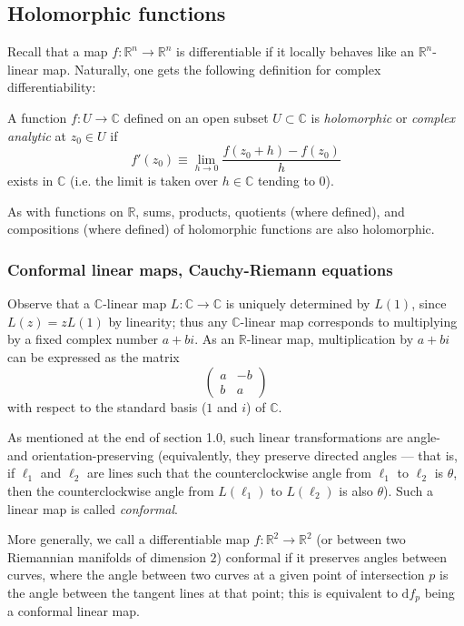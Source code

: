 \documentclass[10pt]{article}
\providecommand{\dd}{\mathrm d}
\providecommand{\CC}{\mathbb C}
\providecommand{\RR}{\mathbb R}
\providecommand{\vocab}[1]{{{\sffamily\textit{#1}}}}
\begin{document}
\subsection{Holomorphic functions}

Recall that a map $f\colon\RR^n\to\RR^n$ is differentiable
if it locally behaves like an $\RR^n$-linear map.
Naturally, one gets the following definition for complex differentiability:
\begin{definition}[Holomorphic]
    \label{def:holomorphic}
    A function $f\colon U\to\CC$ defined on an open subset $U\subset\CC$
    is \vocab{holomorphic} or \vocab{complex analytic} at $z_0\in U$ if
    \begin{equation*}
	f'(z_0)\equiv\lim_{h\to 0}\frac{f(z_0+h) - f(z_0)}h
    \end{equation*}
    exists in $\CC$ (i.e. the limit is taken over $h\in\CC$ tending to $0$).
\end{definition}

As with functions on $\RR$, sums, products, quotients (where defined),
and compositions (where defined) of holomorphic functions
are also holomorphic.

\subsubsection{Conformal linear maps, Cauchy-Riemann equations}
Observe that a $\CC$-linear map $L\colon\CC\to\CC$ is
uniquely determined by $L(1)$, since $L(z) = zL(1)$ by linearity;
thus any $\CC$-linear map corresponds to multiplying by
a fixed complex number $a+bi$. As an $\RR$-linear map,
multiplication by $a+bi$ can be expressed as the matrix
\begin{equation*}
    \begin{pmatrix}
	a&-b\\b&a
    \end{pmatrix}
\end{equation*}
with respect to the standard basis ($1$ and $i$) of $\CC$.

As mentioned at the end of section 1.0, such linear transformations
are angle- and orientation-preserving (equivalently,
they preserve directed angles --- that is, if $\ell_1$ and $\ell_2$
are lines such that the counterclockwise angle
from $\ell_1$ to $\ell_2$ is $\theta$, then the counterclockwise angle
from $L(\ell_1)$ to $L(\ell_2)$ is also $\theta$).
Such a linear map is called \vocab{conformal}.

\begin{remark}
    More generally, we call a differentiable map $f\colon\RR^2\to\RR^2$
    (or between two Riemannian manifolds of dimension $2$)
    conformal if it preserves angles between curves,
    where the angle between two curves at a given point of intersection $p$
    is the angle between the tangent lines at that point;
    this is equivalent to $\dd f_p$ being a conformal linear map.
\end{remark}
\end{document}
